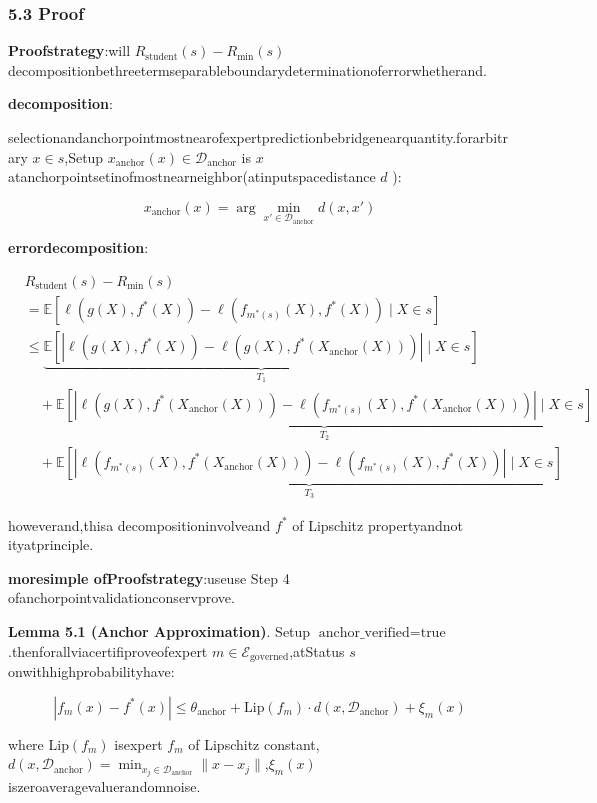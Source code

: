 \documentclass[
  12pt,
]{article}
\begin{document}
\subsubsection{5.3 Proof}\label{ux8bc1ux660e}

\textbf{Proofstrategy}:will \(R_{\text{student}}(s) - R_{\min}(s)\)
decompositionbethreetermseparableboundarydeterminationoferrorwhetherand.

\textbf{decomposition}:

selectionandanchorpointmostnearofexpertpredictionbebridgenearquantity.forarbitrary \(x \in s\),Setup
\(x_{\text{anchor}}(x) \in \mathcal{D}_{\text{anchor}}\) is \(x\)
atanchorpointsetinofmostnearneighbor(atinputspacedistance \(d\) ):

\[x_{\text{anchor}}(x) = \arg\min_{x' \in \mathcal{D}_{\text{anchor}}} d(x, x')\]

\textbf{errordecomposition}:

\[\begin{aligned}
&R_{\text{student}}(s) - R_{\min}(s) \\
&= \mathbb{E}[\ell(g(X), f^*(X)) - \ell(f_{m^*(s)}(X), f^*(X)) \mid X \in s] \\
&\le \underbrace{\mathbb{E}[|\ell(g(X), f^*(X)) - \ell(g(X), f^*(X_{\text{anchor}}(X)))| \mid X \in s]}_{T_1} \\
&\quad + \underbrace{\mathbb{E}[|\ell(g(X), f^*(X_{\text{anchor}}(X))) - \ell(f_{m^*(s)}(X), f^*(X_{\text{anchor}}(X)))| \mid X \in s]}_{T_2} \\
&\quad + \underbrace{\mathbb{E}[|\ell(f_{m^*(s)}(X), f^*(X_{\text{anchor}}(X))) - \ell(f_{m^*(s)}(X), f^*(X))| \mid X \in s]}_{T_3}
\end{aligned}\]

howeverand,thisa decompositioninvolveand \(f^*\) of Lipschitz propertyandnot ityatprinciple.

\textbf{moresimple ofProofstrategy}:useuse Step 4 ofanchorpointvalidationconservprove.

\textbf{Lemma 5.1 (Anchor Approximation)}. Setup
\(\text{anchor\_verified} = \text{true}\).thenforallviacertifiproveofexpert
\(m \in \mathcal{E}_{\text{governed}}\),atStatus \(s\) onwithhighprobabilityhave:

\[|f_m(x) - f^*(x)| \le \theta_{\text{anchor}} + \text{Lip}(f_m) \cdot d(x, \mathcal{D}_{\text{anchor}}) + \xi_m(x)\]

where \(\text{Lip}(f_m)\) isexpert \(f_m\) of Lipschitz
constant,\(d(x, \mathcal{D}_{\text{anchor}}) = \min_{x_j \in \mathcal{D}_{\text{anchor}}} \|x - x_j\|\),\(\xi_m(x)\)
iszeroaveragevaluerandomnoise.
\end{document}
